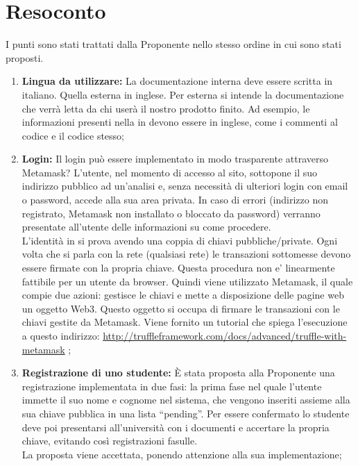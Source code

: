 \documentclass[VER-2017-11-22.tex]{subfiles}
\begin{document}
\chapter{Resoconto}
I punti sono stati trattati dalla Proponente nello stesso ordine in cui sono stati proposti.
\begin{enumerate}
	\item \textbf{Lingua da utilizzare:} La documentazione interna deve essere scritta in italiano. Quella esterna in inglese. Per esterna si intende la documentazione che verrà letta da chi userà il nostro prodotto finito. Ad esempio, le informazioni presenti nella  in  devono essere in inglese, come i commenti al codice e il codice stesso;
	\item \textbf{Login:} Il login può essere implementato in modo trasparente attraverso Metamask? L’utente, nel momento di accesso al sito, sottopone il suo indirizzo pubblico ad un'analisi e, senza necessità di ulteriori login con email o password, accede alla sua area privata. In caso di errori (indirizzo non registrato, Metamask non installato o bloccato da password) verranno presentate all'utente delle informazioni su come procedere.\\	
	L'identità in  si prova avendo una coppia di chiavi pubbliche/private. Ogni volta che si parla con la rete  (qualsiasi rete) le transazioni sottomesse devono essere firmate con la propria chiave. Questa procedura non e' linearmente fattibile per un utente da browser. Quindi viene utilizzato Metamask, il quale compie due azioni: gestisce le chiavi e mette a disposizione delle pagine web un oggetto Web3. Questo oggetto si occupa di firmare le transazioni con le chiavi gestite da Metamask. Viene fornito un tutorial che spiega l'esecuzione a questo indirizzo: \href{http://truffleframework.com/docs/advanced/truffle-with-metamask}{http://truffleframework.com/docs/advanced/truffle-with-metamask} ;
	\item \textbf{Registrazione di uno studente:} \`{E} stata proposta alla Proponente una registrazione implementata in due fasi: la prima fase nel quale l’utente immette il suo nome e cognome nel sistema, che vengono inseriti assieme alla sua chiave pubblica in una lista “pending”. Per essere confermato lo studente deve poi presentarsi all’università con i documenti e accertare la propria chiave, evitando così registrazioni fasulle.\\	
	La proposta viene accettata, ponendo attenzione alla sua implementazione;

\end{enumerate}
\end{document}
